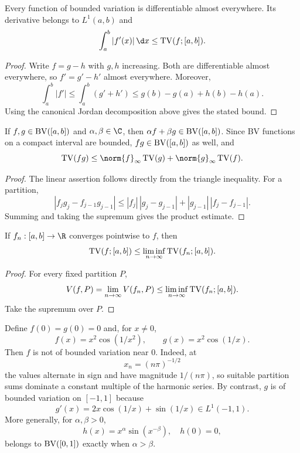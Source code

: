 \begin{cor}
Every function of bounded variation is differentiable almost everywhere. Its derivative belongs to $L^1(a,b)$ and
\[
\int_a^b|f'(x)|\,\d x\leq\TV(f;[a,b]).
\]
\end{cor}

\begin{proof}
Write $f=g-h$ with $g,h$ increasing. Both are differentiable almost everywhere, so $f'=g'-h'$ almost everywhere. Moreover,
\[
\int_a^b|f'|\leq\int_a^b(g'+h')
\leq g(b)-g(a)+h(b)-h(a).
\]
Using the canonical Jordan decomposition above gives the stated bound.
\end{proof}

\begin{prop}
If $f,g\in\operatorname{BV}([a,b])$ and $\alpha,\beta\in\C$, then $\alpha f+\beta g\in\operatorname{BV}([a,b])$. Since BV functions on a compact interval are bounded, $fg\in\operatorname{BV}([a,b])$ as well, and
\[
\TV(fg)\leq \norm{f}_\infty\TV(g)+\norm{g}_\infty\TV(f).
\]
\end{prop}

\begin{proof}
The linear assertion follows directly from the triangle inequality. For a partition,
\[
|f_jg_j-f_{j-1}g_{j-1}|
\leq |f_j|\,|g_j-g_{j-1}|+|g_{j-1}|\,|f_j-f_{j-1}|.
\]
Summing and taking the supremum gives the product estimate.
\end{proof}

\begin{prop}
If $f_n:[a,b]\to\R$ converges pointwise to $f$, then
\[
\operatorname{TV}(f;[a,b])\leq\liminf_{n\to\infty}\operatorname{TV}(f_n;[a,b]).
\]
\end{prop}

\begin{proof}
For every fixed partition $P$,
\[
V(f,P)=\lim_{n\to\infty}V(f_n,P)
\leq\liminf_{n\to\infty}\operatorname{TV}(f_n;[a,b]).
\]
Take the supremum over $P$.
\end{proof}

\begin{eg}
Define $f(0)=g(0)=0$ and, for $x\neq0$,
\[
f(x)=x^2\cos(1/x^2),
\qquad
g(x)=x^2\cos(1/x).
\]
Then $f$ is not of bounded variation near $0$. Indeed, at
\[
x_n=(n\pi)^{-1/2}
\]
the values alternate in sign and have magnitude $1/(n\pi)$, so suitable partition sums dominate a constant multiple of the harmonic series. By contrast, $g$ is of bounded variation on $[-1,1]$ because
\[
g'(x)=2x\cos(1/x)+\sin(1/x)\in L^1(-1,1).
\]
More generally, for $\alpha,\beta>0$,
\[
h(x)=x^\alpha\sin(x^{-\beta}),\quad h(0)=0,
\]
belongs to $\operatorname{BV}([0,1])$ exactly when $\alpha>\beta$.
\end{eg}

